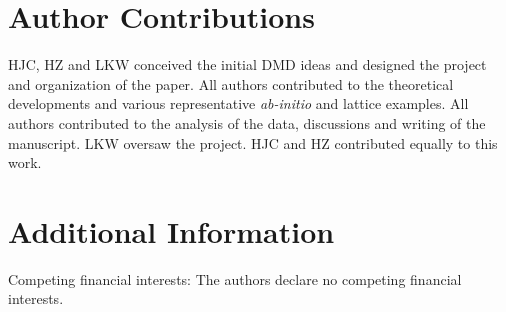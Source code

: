 \section*{Author Contributions}
HJC, HZ and LKW conceived the initial DMD ideas and designed the project and organization of the paper. 
All authors contributed to the theoretical developments and various representative \textit{ab-initio} and lattice examples. 
All authors contributed to the analysis of the data, discussions and writing of the manuscript. 
LKW oversaw the project. HJC and HZ contributed equally to this work.
 
\section*{Additional Information}
Competing financial interests: The authors declare no competing financial interests.
